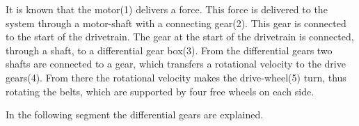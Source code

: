 It is known that the motor(1) delivers a force. This force is delivered to the system through a motor-shaft with a connecting gear(2). This gear is connected to the start of the drivetrain. The gear at the start of the drivetrain is connected, through a shaft, to a differential gear box(3). From the differential gears two shafts are connected to a gear, which transfers a rotational velocity to the drive gears(4).
From there the rotational velocity makes the drive-wheel(5) turn, thus rotating the belts, which are supported by four free wheels on each side. 

In the following segment the differential gears are explained.